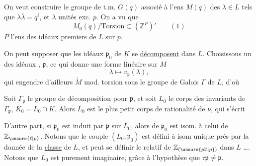 
On veut construire le groupe de t.m. $G(q)$ associé à l'ens $M(q)$ des $\lambda\in L$ tels que $\lambda\bar\lambda=q^i$, et $\lambda$ unités exc. $p$. On a vu que
\[
M_0(q)/\text{Torsion}\subset (\mathbb Z^P)' \qquad (1)
\]
$P$ l'ens des idéaux premiers de $L$ sur $p$.

On peut supposer que les idéaux $\mathfrak p_0$ de $K$ se \uline{décomposent} dans $L$. Choisissons un des  idéaux , $\mathfrak p$, ce qui donne une forme linéaire  sur $M$
\[
\lambda\longmapsto v_{\mathfrak p}(\lambda),
\]
qui engendre d'ailleurs $\check M$ mod. torsion sous le groupe de Galois $\Gamma$ de $L$, d'où

Soit $\Gamma_{\mathfrak p}$ le groupe de décomposition pour $\mathfrak p$,   et soit  $L_0$ le corps des invariants de $\Gamma_{\mathfrak p}$, $K_0=L_0\cap K$. Alors $L_0$ est le plus petit corps de rationalité de $\nu$, qui s'écrit 

D'autre part, si $\mathfrak p_0$ est induit par $\mathfrak p$ sur $L_0$, alors   de $\mathfrak p_0$ est  isom. à celui de $\mathbb Z_{\unsure{\ell|p}}$. Notons que le couple $(L_0,\mathfrak p_0)$ est défini à isom unique près par la donnée de la \uline{classe} de $L$, et peut se définir   le  relatif de $\mathbb Z_{(\unsure{p\mathbb Z|p})}$ dans $L$ \dots. Notons que $L_0$ est purement imaginaire, grâce à l'hypothèse que $\tau\mathfrak p\ne\mathfrak p$.

